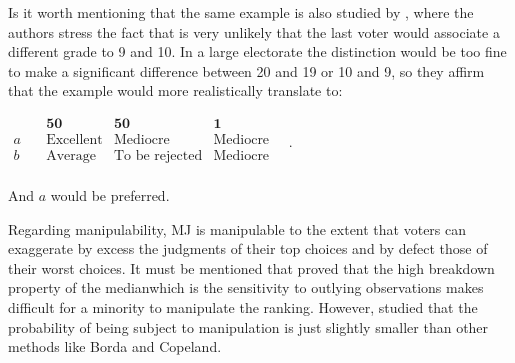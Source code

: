 	Is it worth mentioning that the same example is also studied by \citet[p. 281]{Balinski2011}, where the authors stress the fact that is very unlikely that the last voter would associate a different grade to 9 and 10. In a large electorate the distinction would be too fine to make a significant difference between 20 and 19 or 10 and 9, so they affirm that the example would more realistically translate to: 
	\begin{center}
		$
		\begin{array}{cccc}
			&\mathbf{50} & \mathbf{50} & \mathbf{1} \\
			a \quad &\text{Excellent}&\text{Mediocre}&\text{Mediocre}\\
			b \quad &\text{Average}&\text{To be rejected}&\text{Mediocre}\\
		\end{array}\quad .
		$
	\end{center}
	And $a$ would be preferred.

	Regarding manipulability, \ac{MJ} is manipulable to the extent that voters can exaggerate by excess the judgments of their top choices and by defect those of their worst choices. It must be mentioned that \citet{Bassett1999} proved that the high breakdown property of the median\textemdash which is the sensitivity to outlying observations \textemdash makes difficult for a minority to manipulate the ranking. However, \citet{Gehrlein2003} studied that the probability of being subject to manipulation is just slightly smaller than other methods like Borda and Copeland.










